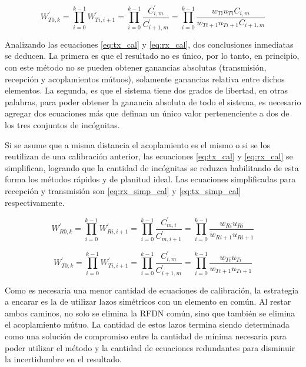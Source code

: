 \begin{equation}
	W^{'}_{T0,k} = \prod_{i=0}^{k-1} W^{'}_{Ti,i+1} = \prod_{i=0}^{k-1}\dfrac{C^{'}_{i,m}}{C^{'}_{i+1, m}} = 
		\prod_{i=0}^{k-1}\dfrac{w_{Ti} u_{Ti} C_{i,m}}{w_{Ti + 1} u_{Ti + 1}C_{i + 1, m}}
	\label{eq:tx_cal}
\end{equation}

Analizando las ecuaciones \ref{eq:tx_cal} y \ref{eq:rx_cal}, dos conclusiones inmediatas se deducen. La primera es que el 
resultado no es único, por lo tanto, en principio, con este método no se pueden obtener ganancias absolutas (transmisión, 
recepción y acoplamientos mútuos), solamente ganancias relativa entre dichos elementos. La segunda, es que el sistema tiene 
dos grados de libertad, en otras palabras, para poder obtener la ganancia absoluta de todo el sistema, es necesario agregar 
dos ecuaciones más que definan un único valor pertenenciente a dos de los tres conjuntos de incógnitas.

Si se asume que a misma distancia el acoplamiento es el mismo o si se los reutilizan de una calibración anterior, las 
ecuaciones \ref{eq:tx_cal} y \ref{eq:rx_cal} se simplifican, logrando que la cantidad de incógnitas se reduzca habilitando 
de esta forma los métodos rápidos y de planitud ideal. Las ecuaciones simplificadas para recepción y transmisión son 
\ref{eq:rx_simp_cal} y \ref{eq:tx_simp_cal} respectivamente.

\begin{equation}
	W^{'}_{R0,k} = \prod_{i=0}^{k-1} W^{'}_{Ri,i+1} = \prod_{i=0}^{k-1}\dfrac{C^{'}_{m,i}}{C^{'}_{m,i+1}} =
		\prod_{i=0}^{k-1}\dfrac{w_{Ri} u_{Ri}}{w_{Ri + 1} u_{Ri + 1}}
	\label{eq:rx_simp_cal}
\end{equation}

\begin{equation}
	W^{'}_{T0,k} = \prod_{i=0}^{k-1} W^{'}_{Ti,i+1} = \prod_{i=0}^{k-1}\dfrac{C^{'}_{i,m}}{C^{'}_{i+1, m}} = 
		\prod_{i=0}^{k-1}\dfrac{w_{Ti} u_{Ti}}{w_{Ti + 1} u_{Ti + 1}}
	\label{eq:tx_simp_cal}
\end{equation}

Como es necesaria una menor cantidad de ecuaciones de calibración, la estrategia a encarar es la de utilizar lazos simétricos 
con un elemento en común. Al restar ambos caminos, no solo se elimina la RFDN común, sino que también se elimina el 
acoplamiento mútuo. La cantidad de estos lazos termina siendo determinada como una solución de compromiso entre la cantidad de
mínima necesaria para poder utilizar el método y la cantidad de ecuaciones redundantes para disminuir la incertidumbre en el 
resultado.

